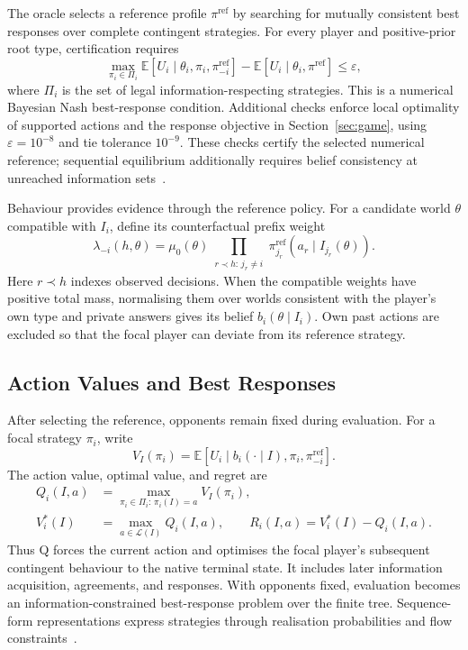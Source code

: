 \documentclass[11pt,a4paper]{article}
\newcommand{\E}{\mathbb{E}}
\begin{document}
The oracle selects a reference profile $\pi^{\mathrm{ref}}$ by searching
for mutually consistent best responses over complete contingent
strategies. For every player and positive-prior root type, certification
requires
\begin{equation}
 \max_{\pi_i\in\Pi_i}
 \E[U_i\mid\theta_i,\pi_i,\pi_{-i}^{\mathrm{ref}}]
 -\E[U_i\mid\theta_i,\pi^{\mathrm{ref}}]\leq\varepsilon,
 \label{eq:reference-certificate}
\end{equation}
where $\Pi_i$ is the set of legal information-respecting strategies.
This is a numerical Bayesian Nash best-response condition. Additional
checks enforce local optimality of supported actions and the response
objective in Section~\ref{sec:game}, using $\varepsilon=10^{-8}$ and tie
tolerance $10^{-9}$. These checks certify the selected numerical
reference; sequential equilibrium additionally requires belief consistency
at unreached information sets~\cite{kreps1982sequential}.

Behaviour provides evidence through the reference policy. For a candidate
world $\theta$ compatible with $I_i$, define its counterfactual prefix weight
\begin{equation}
 \lambda_{-i}(h,\theta)=\mu_0(\theta)
 \prod_{\substack{r\prec h:\,j_r\ne i}}
 \pi_{j_r}^{\mathrm{ref}}(a_r\mid I_{j_r}(\theta)).
 \label{eq:cf-weight}
\end{equation}
Here $r\prec h$ indexes observed decisions. When the compatible weights
have positive total mass, normalising them over worlds consistent with the
player's own type and private answers gives its belief
$b_i(\theta\mid I_i)$. Own past actions are excluded so that the
focal player can deviate from its reference strategy.

\subsection{Action Values and Best Responses}
After selecting the reference, opponents remain fixed during evaluation.
For a focal strategy $\pi_i$, write
\begin{equation}
 V_I(\pi_i)=\E[U_i\mid b_i(\cdot\mid I),\pi_i,
                              \pi_{-i}^{\mathrm{ref}}].
\end{equation}
The action value, optimal value, and regret are
\begin{align}
 Q_i(I,a)&=\max_{\pi_i\in\Pi_i:\,\pi_i(I)=a}V_I(\pi_i),
 \label{eq:q}\\
 V_i^*(I)&=\max_{a\in\mathcal L(I)}Q_i(I,a),\qquad
 R_i(I,a)=V_i^*(I)-Q_i(I,a).
 \label{eq:regret}
\end{align}
Thus Q forces the current action and optimises the focal player's
subsequent contingent behaviour to the native terminal state. It includes
later information acquisition, agreements, and responses. With opponents
fixed, evaluation becomes an information-constrained best-response problem
over the finite tree. Sequence-form
representations express strategies through realisation probabilities and
flow constraints~\cite{koller1996sequence}.
\end{document}
